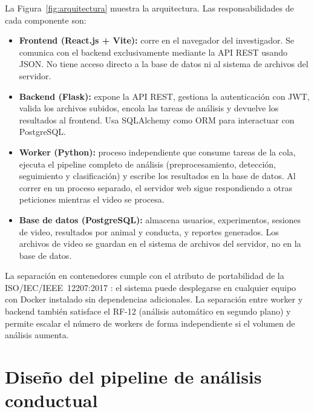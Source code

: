La Figura~\ref{fig:arquitectura} muestra la arquitectura. Las responsabilidades de
cada componente son:

\begin{itemize}
  \item \textbf{Frontend (React.js + Vite):} corre en el navegador del investigador.
        Se comunica con el backend exclusivamente mediante la API REST usando JSON.
        No tiene acceso directo a la base de datos ni al sistema de archivos del
        servidor.

  \item \textbf{Backend (Flask):} expone la API REST, gestiona la autenticación con
        JWT, valida los archivos subidos, encola las tareas de análisis y devuelve
        los resultados al frontend. Usa SQLAlchemy como ORM para interactuar con
        PostgreSQL.

  \item \textbf{Worker (Python):} proceso independiente que consume tareas de la
        cola, ejecuta el pipeline completo de análisis (preprocesamiento, detección,
        seguimiento y clasificación) y escribe los resultados en la base de datos.
        Al correr en un proceso separado, el servidor web sigue respondiendo a
        otras peticiones mientras el video se procesa.

  \item \textbf{Base de datos (PostgreSQL):} almacena usuarios, experimentos,
        sesiones de video, resultados por animal y conducta, y reportes generados.
        Los archivos de video se guardan en el sistema de archivos del servidor, no
        en la base de datos.
\end{itemize}

La separación en contenedores cumple con el atributo de portabilidad de la
ISO/IEC/IEEE~12207:2017 \cite{iso12207}: el sistema puede desplegarse en cualquier
equipo con Docker instalado sin dependencias adicionales. La separación entre worker
y backend también satisface el RF-12 (análisis automático en segundo plano) y permite
escalar el número de workers de forma independiente si el volumen de análisis aumenta.

\section{Diseño del pipeline de análisis conductual}

